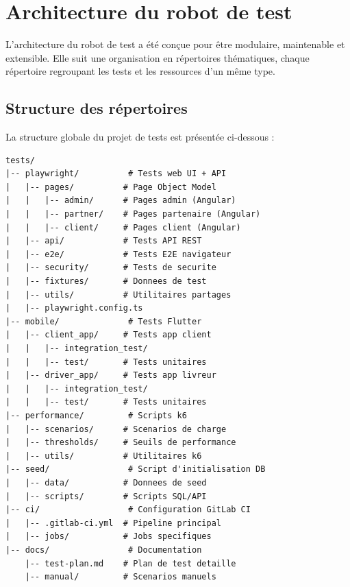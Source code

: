 \section{Architecture du robot de test}
\label{sec:architecture-robot}

L'architecture du robot de test a été conçue pour être modulaire, maintenable et extensible. Elle suit une organisation en répertoires thématiques, chaque répertoire regroupant les tests et les ressources d'un même type.

\subsection{Structure des répertoires}
\label{subsec:structure-repertoires}

La structure globale du projet de tests est présentée ci-dessous :

\begin{lstlisting}[language={}, caption={Structure des répertoires du robot de tests}, label={lst:structure-dirs}]
tests/
|-- playwright/          # Tests web UI + API
|   |-- pages/          # Page Object Model
|   |   |-- admin/      # Pages admin (Angular)
|   |   |-- partner/    # Pages partenaire (Angular)
|   |   |-- client/     # Pages client (Angular)
|   |-- api/            # Tests API REST
|   |-- e2e/            # Tests E2E navigateur
|   |-- security/       # Tests de securite
|   |-- fixtures/       # Donnees de test
|   |-- utils/          # Utilitaires partages
|   |-- playwright.config.ts
|-- mobile/              # Tests Flutter
|   |-- client_app/     # Tests app client
|   |   |-- integration_test/
|   |   |-- test/       # Tests unitaires
|   |-- driver_app/     # Tests app livreur
|   |   |-- integration_test/
|   |   |-- test/       # Tests unitaires
|-- performance/         # Scripts k6
|   |-- scenarios/      # Scenarios de charge
|   |-- thresholds/     # Seuils de performance
|   |-- utils/          # Utilitaires k6
|-- seed/                # Script d'initialisation DB
|   |-- data/           # Donnees de seed
|   |-- scripts/        # Scripts SQL/API
|-- ci/                  # Configuration GitLab CI
|   |-- .gitlab-ci.yml  # Pipeline principal
|   |-- jobs/           # Jobs specifiques
|-- docs/                # Documentation
    |-- test-plan.md    # Plan de test detaille
    |-- manual/         # Scenarios manuels
\end{lstlisting}

